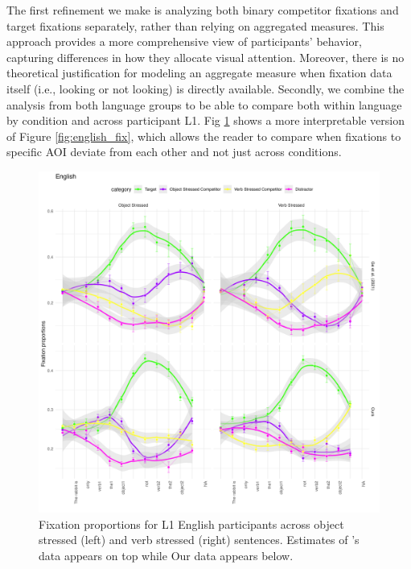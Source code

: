 The first refinement we make is analyzing both binary competitor fixations and target fixations separately, rather than relying on aggregated measures. This approach provides a more comprehensive view of participants’ behavior, capturing differences in how they allocate visual attention. Moreover, there is no theoretical justification for modeling an aggregate measure when fixation data itself (i.e., looking or not looking) is directly available. Secondly, we combine the analysis from both language groups to be able to compare both within language by condition and across participant L1. Fig \ref{fig:english_fix2} shows a more interpretable version of Figure \ref{fig:english_fix}, which allows the reader to compare when fixations to specific AOI deviate from each other and not just across conditions.

\begin{figure}[H]  %
    \centering
    \includegraphics[width=\textwidth,height=\textheight,keepaspectratio]{viz/english_fix2.png}
    \caption{Fixation proportions for L1 English participants across object stressed (left) and verb stressed (right) sentences. Estimates of \citep{Ge2021}'s data appears on top while Our data appears below.}
    \label{fig:english_fix2}
\end{figure}

